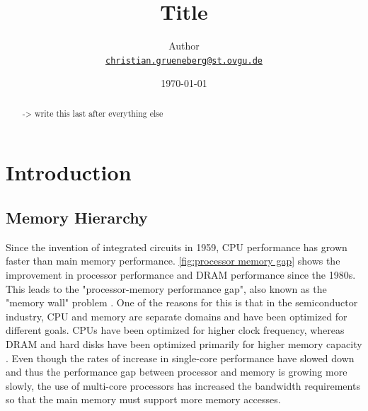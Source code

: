 \documentclass[
	12pt,
	a4paper,
	abstract,
	bibliography=totoc,
	chapterprefix,
	headings=openright,
	numbers=endperiod,
	parskip=half,
	twoside,
]{scrreprt}
\title{Title}
\author{
Author\\
{\large\href{mailto:christian.grueneberg@st.ovgu.de}{\nolinkurl{christian.grueneberg@st.ovgu.de}}}
}
\date{\today}
\begin{document}
{}

\maketitle

\begin{abstract}


-> write this last after everything else

\end{abstract}

\tableofcontents

\cleardoubleoddpage
{}

\chapter{Introduction}
\label{cha:introduction}



\section{Memory Hierarchy}
Since the invention of integrated circuits in 1959, CPU performance has grown faster than main memory performance.
\cref{fig:processor memory gap} shows the improvement in processor performance and DRAM performance since the 1980s.
This leads to the "processor-memory performance gap", also known as the "memory wall" problem \cite{wulf1995hitting}.
One of the reasons for this is that in the semiconductor industry, CPU and memory are separate domains and have been optimized for different goals.
CPUs have been optimized for higher clock frequency, whereas DRAM and hard disks have been optimized primarily for higher memory capacity \cite{cpu-mem-gap}.
Even though the rates of increase in single-core performance have slowed down and thus the performance gap between processor and memory is growing more slowly, the use of multi-core processors has increased the bandwidth requirements so that the main memory must support more memory accesses.
\end{document}

